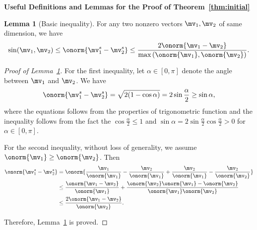 \documentclass[lettersize,onecolumn,journal]{IEEEtran}
\theoremstyle{definition}
\newtheorem{lem}{Lemma}
\theoremstyle{definition}
\begin{document}



{\bf Useful Definitions and Lemmas for the Proof of Theorem~\ref{thm:initial}} 
\begin{lem}[Basic inequality]\label{lem:norm_diff} For any two nonzero vectors $\mv_1,\mv_2$ of same dimension, we have 
\[
\sin(\mv_1 , \mv_2) \leq \onorm{{\mv_1^s}-{\mv_2^s}}\leq {2\onorm{\mv_1-\mv_2}\over \max\left(\onorm{\mv_1},\onorm{\mv_2}\right)}.
\]
\end{lem}
\begin{proof}[Proof of Lemma~\ref{lem:norm_diff}]
For the first inequality, let $\alpha \in [0,\pi]$ denote the angle between $\mv_1$ and $\mv_2$. We have 
\begin{align}
     \onorm{{\mv_1^s}-{\mv_2^s}} = \sqrt{2(1 - \cos \alpha)} = 2 \sin \frac{\alpha}{2} \geq \sin \alpha,
\end{align}
where the equations follows from the properties of trigonometric function and the inequality follows from the fact the $\cos \frac{\alpha}{2} \leq 1$ and $\sin \alpha = 2 \sin \frac{\alpha}{2} \cos \frac{\alpha}{2} > 0$ for $\alpha \in [0, \pi]$. 

For the second inequality, without loss of generality, we assume $\onorm{\mv_1}\geq \onorm{\mv_2}$. Then
\begin{align}
\onorm{{\mv_1^s}-{\mv_2^s}}&=\onorm{{\mv_1\over \onorm{\mv_1}}- {\mv_2\over \onorm{\mv_1}}+{\mv_2\over \onorm{\mv_1}}-{\mv_2\over \onorm{\mv_2}}}\\
&\leq {\onorm{\mv_1-\mv_2}\over \onorm{\mv_1}}+{\onorm{\mv_2}\onorm{\mv_1}-\onorm{\mv_2}\over \onorm{\mv_1}\onorm{\mv_2}}\\
&\leq {2\onorm{\mv_1-\mv_2}\over \onorm{\mv_2}}.
\end{align}

Therefore, Lemma~\ref{lem:norm_diff} is proved.
\end{proof}
\end{document}
